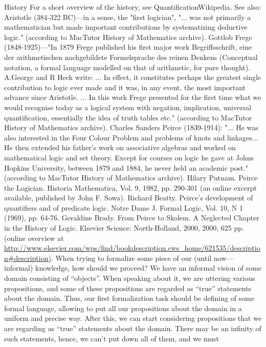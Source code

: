 History
For a short overview of the history, see QuantificationWikipedia.
See also:
Aristotle (384-322 BC)---in a sense, the "first logician", "... was not primarily a mathematician but made important
contributions by systematizing deductive logic." (according to MacTutor History of Mathematics archive).
Gottlob Frege (1848-1925)---"In 1879 Frege published his first major work Begriffsschrift, eine der arithmetischen
nachgebildete Formelsprache des reinen Denkens (Conceptual notation, a formal language modelled on that of arithmetic, for
pure thought). A.George and R Heck write: ... In effect, it constitutes perhaps the greatest single contribution to logic ever
made and it was, in any event, the most important advance since Aristotle. ... In this work Frege presented for the first time
what we would recognise today as a logical system with negation, implication, universal quantification, essentially the idea of
truth tables etc." (according to MacTutor History of Mathematics archive).
Charles Sanders Peirce (1839-1914): "... He was also interested in the Four Colour Problem and problems of knots and
linkages... He then extended his father's work on associative algebras and worked on mathematical logic and set theory. Except
for courses on logic he gave at Johns Hopkins University, between 1879 and 1884, he never held an academic post."
(according to MacTutor History of Mathematics archive).
Hilary Putnam. Peirce the Logician. Historia Mathematica, Vol. 9, 1982, pp. 290-301 (an online excerpt available, published
by John F. Sowa).
Richard Beatty. Peirce's development of quantifiers and of predicate logic. Notre Dame J. Formal Logic, Vol. 10, N 1 (1969),
pp. 64-76.
Geraldine Brady. From Peirce to Skolem. A Neglected Chapter in the History of Logic. Elsevier Science: North-Holland, 2000,
2000, 625 pp. (online overview at
\url{http://www.elsevier.com/wps/find/bookdescription.cws\_home/621535/description#description)}.
When trying to formalize some piece of our (until now---informal) knowledge, how should we proceed?
We have an informal vision of some domain consisting of ``objects''. When speaking about it, we are
uttering various propositions, and some of these propositions are regarded as ``true'' statements about the
domain.
Thus, our first formalization task should be defining of some formal language, allowing to put all our
propositions about the domain in a uniform and precise way.
After this, we can start considering propositions that we are regarding as ``true'' statements about the
domain. There may be an infinity of such statements, hence, we can't put down all of them, and we must

